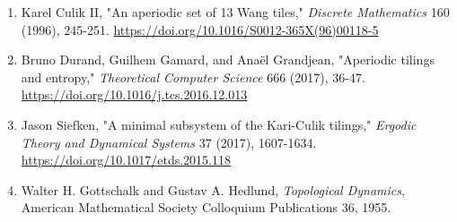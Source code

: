 \documentclass[11pt]{article}
\begin{document}
\begin{enumerate}
\item Karel Culik II, "An aperiodic set of 13 Wang tiles,"
   \emph{Discrete Mathematics} 160 (1996), 245-251.
   \url{https://doi.org/10.1016/S0012-365X(96)00118-5}

\item Bruno Durand, Guilhem Gamard, and Anaël Grandjean, "Aperiodic tilings and
   entropy," \emph{Theoretical Computer Science} 666 (2017), 36-47.
   \url{https://doi.org/10.1016/j.tcs.2016.12.013}

\item Jason Siefken, "A minimal subsystem of the Kari-Culik tilings,"
   \emph{Ergodic Theory and Dynamical Systems} 37 (2017), 1607-1634.
   \url{https://doi.org/10.1017/etds.2015.118}

\item Walter H. Gottschalk and Gustav A. Hedlund, \emph{Topological Dynamics},
   American Mathematical Society Colloquium Publications 36, 1955.
\end{enumerate}
\end{document}
